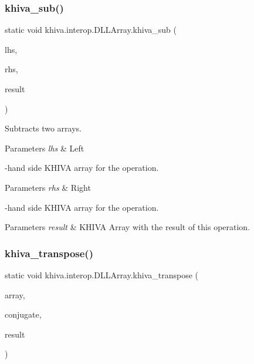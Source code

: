 \subsubsection{\texorpdfstring{khiva\+\_\+sub()}{khiva\_sub()}}
{\footnotesize\ttfamily static void khiva.\+interop.\+D\+L\+L\+Array.\+khiva\+\_\+sub (\begin{DoxyParamCaption}\item[{\mbox{[}\+In\mbox{]} ref Int\+Ptr}]{lhs,  }\item[{\mbox{[}\+In\mbox{]} ref Int\+Ptr}]{rhs,  }\item[{\mbox{[}\+Out\mbox{]} out Int\+Ptr}]{result }\end{DoxyParamCaption})\hspace{0.3cm}{\ttfamily [static]}}



Subtracts two arrays. 


\begin{DoxyParams}{Parameters}
{\em lhs} & Left\\
\hline
\end{DoxyParams}
-\/hand side K\+H\+I\+VA array for the operation. 
\begin{DoxyParams}{Parameters}
{\em rhs} & Right\\
\hline
\end{DoxyParams}
-\/hand side K\+H\+I\+VA array for the operation. 
\begin{DoxyParams}{Parameters}
{\em result} & K\+H\+I\+VA Array with the result of this operation.\\
\hline
\end{DoxyParams}
\mbox{\label{classkhiva_1_1interop_1_1_d_l_l_array_a3c36f406b88f909f8659daff96302f9a}} 
\subsubsection{\texorpdfstring{khiva\+\_\+transpose()}{khiva\_transpose()}}
{\footnotesize\ttfamily static void khiva.\+interop.\+D\+L\+L\+Array.\+khiva\+\_\+transpose (\begin{DoxyParamCaption}\item[{\mbox{[}\+In\mbox{]} ref Int\+Ptr}]{array,  }\item[{\mbox{[}\+In\mbox{]} ref bool}]{conjugate,  }\item[{\mbox{[}\+Out\mbox{]} out Int\+Ptr}]{result }\end{DoxyParamCaption})\hspace{0.3cm}{\ttfamily [static]}}



